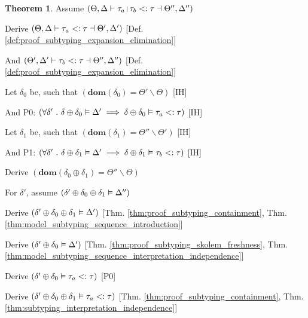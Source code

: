 \documentclass[acmsmall]{acmart}
\theoremstyle{definition}
\newtheorem{theorem}{Theorem}[section]
\begin{document}
\begin{theorem}

  \item \N Assume $(
    \Theta, \Delta \entails
    \tau_a\J{|}\tau_b \subtypes \tau
    \given \Theta'', \Delta'' 
  )$

  \item \I \N Derive $(
    \Theta, \Delta \vdash
    \tau_a <: \tau
    \dashv \Theta', \Delta'
  )$ [Def. \ref{def:proof_subtyping_expansion_elimination}]

  \item \I \N And $(
    \Theta', \Delta' \vdash
    \tau_b <: \tau
    \dashv \Theta'', \Delta''
  )$ [Def. \ref{def:proof_subtyping_expansion_elimination}]

  \item \I \N Let $\delta_0$ be, such that $(
    \textbf{dom}(\delta_0) = \Theta' \backslash \Theta
  )$ [IH]
  \item \I \N And P0: $(
    \forall \delta' \ .\  
    \delta \oplus \delta_0 \vDash \Delta' 
    \implies 
    \delta \oplus \delta_0 \vDash \tau_a <: \tau
  )$ [IH]

  \item \I \N Let $\delta_1$ be, such that $(
    \textbf{dom}(\delta_1) = \Theta'' \backslash \Theta'
  )$ [IH]
  \item \I \N And P1: $(
    \forall \delta' \ .\  
    \delta \oplus \delta_1 \vDash \Delta' 
    \implies 
    \delta \oplus \delta_1 \vDash \tau_b <: \tau
  )$ [IH]

  \item \I \N Derive $(
    \textbf{dom}(\delta_0 \oplus \delta_1) = \Theta'' \backslash \Theta
  )$
  \item \I \N For $\delta'$, assume $(\delta' \oplus \delta_0 \oplus \delta_1 \vDash \Delta'')$

  \item \I\I \N Derive $(\delta' \oplus \delta_0 \oplus \delta_1 \vDash \Delta')$
    [Thm. \ref{thm:proof_subtyping_containment}, Thm. \ref{thm:model_subtyping_sequence_introduction}]
  \item \I\I \N Derive $(\delta' \oplus \delta_0 \vDash \Delta')$
    [Thm. \ref{thm:proof_subtyping_skolem_freshness}, Thm. \ref{thm:model_subtyping_sequence_interpretation_independence}]
  \item \I\I \N Derive $(
    \delta' \oplus \delta_0 \vDash \tau_a <: \tau
  )$ [P0]

  \item \I\I \N Derive $(
    \delta' \oplus \delta_0 \oplus \delta_1 \vDash \tau_a <: \tau
  )$ [Thm. \ref{thm:proof_subtyping_containment}, Thm. \ref{thm:subtyping_interpretation_independence}]


\end{theorem}
\end{document}
